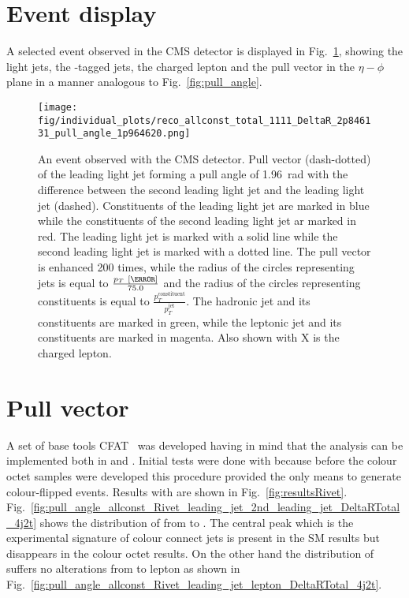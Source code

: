 \section{Event display}
A selected event observed in the CMS detector is displayed in Fig.~\ref{fig:event_display}, showing the light jets, the \cPqb-tagged jets, the charged lepton and the pull vector in the $\eta-\phi$ plane in a manner analogous to Fig.~\ref{fig:pull_angle}.

\begin{figure}[hbtp]
  \centering
  \texttt{[image: fig/individual\_plots/reco\_allconst\_total\_1111\_DeltaR\_2p846131\_pull\_angle\_1p964620.png]}
  \caption{An event observed with the CMS detector. Pull vector (dash-dotted) of the leading light jet forming a pull angle of 1.96~rad with the difference between the second leading light jet and the leading light jet (dashed). Constituents of the leading light jet are marked in blue while the constituents of the second leading light jet ar marked in red. The leading light jet is marked with a solid line while the second leading light jet is marked with a dotted line. The pull vector is enhanced 200 times, while the radius of the circles representing jets is equal to $\frac{p_{T}~[\GeV]}{75.0}$ and the radius of the circles representing constituents is equal to $\frac{p^{\text{constituent}}_{T}}{p^{\text{jet}}_{T}}$. The hadronic \cPqb jet and its constituents are marked in green, while the leptonic \cPqb jet and its constituents are marked in magenta. Also shown with X is the charged lepton.}
  \label{fig:event_display}
\end{figure}

\section{Pull vector}

A set of base tools \textsc{CFAT}~\cite{url:cfat} was developed having in mind that the analysis can be implemented both in \RIVET and \CMSSW. Initial tests were done with \RIVET because before the colour octet \PW samples were developed this procedure provided the only means to generate colour-flipped events. Results with \RIVET are shown in Fig.~\ref{fig:resultsRivet}. Fig.~\ref{fig:pull_angle_allconst_Rivet_leading_jet_2nd_leading_jet_DeltaRTotal_4j2t} shows the distribution of \pullangle from \leadingjet to \scndleadingjet. The central peak which is the experimental signature of colour connect jets is present in the SM results but disappears in the \PW colour octet results. On the other hand the distribution of \pullangle suffers no alterations from \leadingjet to lepton as shown in Fig.~\ref{fig:pull_angle_allconst_Rivet_leading_jet_lepton_DeltaRTotal_4j2t}.

